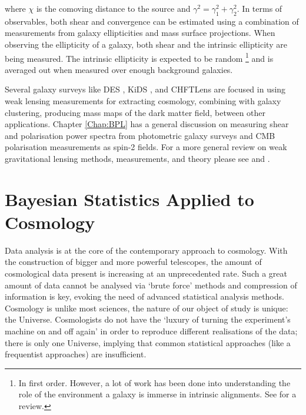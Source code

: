 where $\chi$ is the comoving distance to the source and $\gamma^2 = \gamma_1^2 + \gamma_2^2$. In terms of observables, both shear and convergence can be estimated using a combination of measurements from galaxy ellipticities and mass surface projections. When observing the ellipticity of a galaxy, both shear and the intrinsic ellipticity are being measured. The intrinsic ellipticity is expected to be random \footnote{In first order. However, a lot of work has been done into understanding the role of the environment a galaxy is immerse in intrinsic alignments. See \cite{2015Kirk_IA} for a review.} and is averaged out when measured over enough background galaxies. 

\qquad Several galaxy surveys like DES \citep{2017arXiv170801530D}, KiDS \citep{2017MNRAS.465.1454H}, and CHFTLens \citep{2014CHFTLens} are focused in using weak lensing measurements for extracting cosmology, combining with galaxy clustering, producing mass maps of the dark matter field, between other applications. Chapter \ref{Chap:BPL} has a general discussion on measuring shear and polarisation power spectra from photometric galaxy surveys and CMB polarisation measurements as spin-2 fields. For a more general review on weak gravitational lensing methods, measurements, and theory please see \cite{2005astro.ph..9252S} and \cite{2017SchpJ..1232440B}.


\section{Bayesian Statistics Applied to Cosmology}\label{sec:intro:motivation}
Data analysis is at the core of the contemporary approach to cosmology. With the construction of bigger and more powerful telescopes, the amount of cosmological data present is increasing at an unprecedented rate. Such a great amount of data cannot be analysed via `brute force' methods and compression of information is key, evoking the need of advanced statistical analysis methods. Cosmology is unlike most sciences, the nature of our object of study is unique: the Universe. Cosmologists do not have the `luxury of turning the experiment's machine on and off again' in order to reproduce different realisations of the data; there is only one Universe, implying that common statistical approaches (like a frequentist approaches) are insufficient.


